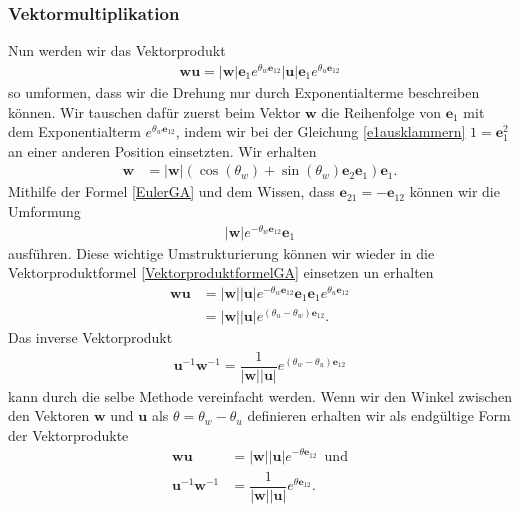 \subsubsection{Vektormultiplikation}
Nun werden wir das Vektorprodukt
\begin{align} \label{VektorproduktformelGA}
\mathbf{wu} = |\mathbf{w}|\mathbf{e}_1 e^{\theta_w \mathbf{e}_{12}}|\mathbf{u}|\mathbf{e}_1 e^{\theta_u \mathbf{e}_{12}}
\end{align}
so umformen, dass wir die Drehung nur durch Exponentialterme beschreiben können. Wir tauschen dafür zuerst beim Vektor $\mathbf{w}$ die Reihenfolge von 
$\mathbf{e}_1$ mit dem Exponentialterm $e^{\theta_w \mathbf{e}_{12}}$, indem wir bei der Gleichung \eqref{e1ausklammern} $1=\mathbf{e}_1^2$ an einer anderen Position einsetzten. Wir erhalten
\begin{align} 
\mathbf{w} &= |\mathbf{w}|\left(\cos(\theta_w)+ \sin(\theta_w) \mathbf{e}_2\mathbf{e}_1\right)\mathbf{e}_1.
\end{align}
Mithilfe der Formel \eqref{EulerGA} und dem Wissen, dass $\mathbf{e}_{21}= -\mathbf{e}_{12}$ können wir die Umformung
\begin{align}
|\mathbf{w}|e^{-\theta_w \mathbf{e}_{12}}\mathbf{e}_1
\end{align}
ausführen. Diese wichtige Umstrukturierung können wir wieder in die Vektorproduktformel \eqref{VektorproduktformelGA} einsetzen un erhalten
\begin{align}
\mathbf{wu} &= |\mathbf{w}||\mathbf{u}|e^{-\theta_w \mathbf{e}_{12}}\mathbf{e}_1\mathbf{e}_1 e^{\theta_u \mathbf{e}_{12}}\\
&= |\mathbf{w}||\mathbf{u}|e^{(\theta_u-\theta_w) \mathbf{e}_{12}}.
\end{align}
Das inverse Vektorprodukt
\begin{align}
\mathbf{u}^{-1}\mathbf{w}^{-1} = \dfrac{1}{|\mathbf{w}||\mathbf{u}|}e^{(\theta_w-\theta_u) \mathbf{e}_{12}}
\end{align}
kann durch die selbe Methode vereinfacht werden.
Wenn wir den Winkel zwischen den Vektoren  $\mathbf{w}$ und $\mathbf{u}$ als $\theta = \theta_w - \theta_u$ definieren erhalten wir als endgültige Form der Vektorprodukte
\begin{align}\label{wuExpo}
\mathbf{wu} &= |\mathbf{w}||\mathbf{u}|e^{-\theta \mathbf{e}_{12}}\enspace\text{und}\\
\mathbf{u}^{-1}\mathbf{w}^{-1} &= \dfrac{1}{|\mathbf{w}||\mathbf{u}|}e^{\theta \mathbf{e}_{12}} \label{wuExpoInv}.
\end{align}
